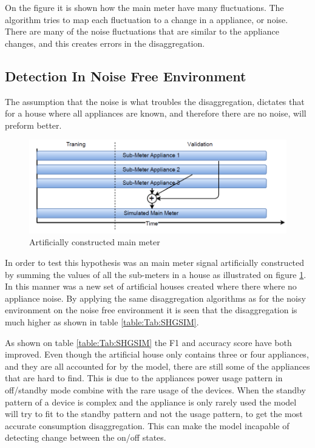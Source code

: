 On the figure it is shown how the main meter have many fluctuations. The algorithm tries to map each fluctuation to a change in a appliance, or noise. There are many of the noise fluctuations that are similar to the appliance changes, and this creates errors in the disaggregation. 

\subsection{Detection In Noise Free Environment }
\label{sec:NOISEFREE}
The assumption that the noise is what troubles the disaggregation, dictates that for a house where all appliances are known, and therefore there are no noise, will preform better. 

\begin{figure}[H]
\centering
\includegraphics[width=1\textwidth]{billeder/SimIllu.png}
\caption{Artificially constructed main meter}
\label{fig:SIL}
\end{figure}

In order to test this hypothesis was an main meter signal artificially constructed by summing the values of all the sub-meters in a house as illustrated on figure \ref{fig:SIL}. In this manner was a new set of artificial houses created where there where no appliance noise. By applying the same disaggregation algorithms as for the noisy environment on the noise free environment it is seen that the disaggregation is much higher as shown in table \ref{table:Tab:SHGSIM}.

  

As shown on table \ref{table:Tab:SHGSIM} the F1 and accuracy score have both improved. Even though the artificial house only contains three or four appliances, and they are all accounted for by the model, there are still some of the appliances that are hard to find. This is due to the appliances power usage pattern in off/standby mode combine with the rare usage of the devices. When the standby pattern of a device is complex and the appliance is only rarely used the model will try to fit to the standby pattern and not the usage pattern, to get the most accurate consumption disaggregation. This can make the model incapable of detecting change between the on/off states.

